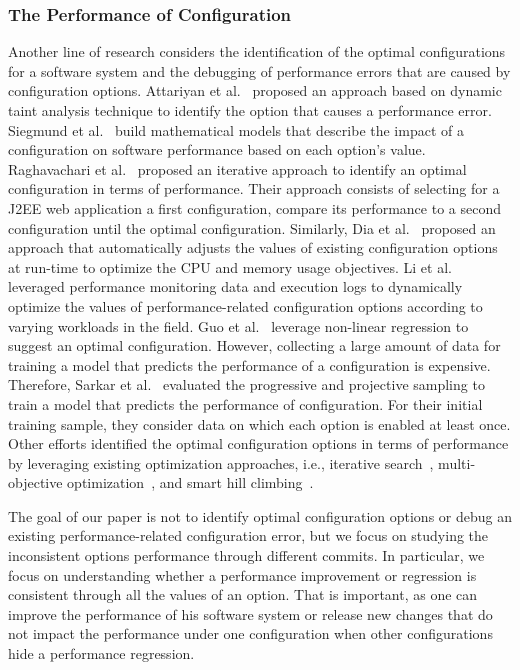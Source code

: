 \subsubsection{The Performance of Configuration} 

Another line of research considers the identification of the optimal configurations for a software system and the debugging of performance errors that are caused by configuration options. Attariyan et al.~\cite{RN3253} proposed an approach based on dynamic taint analysis technique to identify the option that causes a performance error. %
Siegmund et al.~\cite{RN2880} build mathematical models that describe the impact of a configuration on software performance based on each option's value. Raghavachari et al.~\cite{RN3537} proposed an iterative approach to identify an optimal configuration in terms of performance. Their approach consists of selecting for a J2EE web application a first configuration, compare its performance to a second configuration until the optimal configuration. Similarly, Dia et al.~\cite{RN3543} proposed an approach that automatically adjusts the values of existing configuration options at run-time to optimize the CPU and memory usage objectives. Li et al.~\cite{LiAutoConfig} leveraged performance monitoring data and execution logs to dynamically optimize the values of performance-related configuration options according to varying workloads in the field. Guo et al.~\cite{RN3544} leverage non-linear regression to suggest an optimal configuration. However, collecting a large amount of data for training a model that predicts the performance of a configuration is expensive. Therefore, Sarkar et al.~\cite{RN3089} evaluated the progressive and projective sampling to train a model that predicts the performance of configuration. For their initial training sample, they consider data on which each option is enabled at least once. Other efforts identified the optimal configuration options in terms of performance by leveraging existing optimization approaches, i.e., iterative search~\cite{RN3545}, multi-objective optimization~\cite{singh2016optimizing}, and smart hill climbing~\cite{RN3518}.


The goal of our paper is not to identify optimal configuration options or debug an existing performance-related configuration error, but we focus on studying the inconsistent options performance through different commits. In particular, we focus on understanding whether a performance improvement or regression is consistent through all the values of an option. That is important, as one can improve the performance of his software system or release new changes that do not impact the performance under one configuration when other configurations hide a performance regression. 

